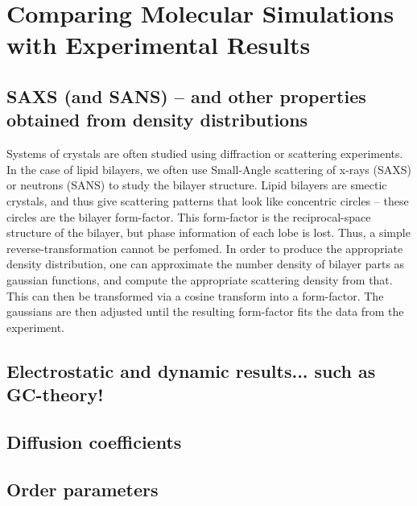 \section{Comparing Molecular Simulations with Experimental Results}
\subsection{SAXS (and SANS) -- and other properties obtained from density distributions}
Systems of crystals are often studied using diffraction or scattering experiments. 
In the case of lipid bilayers, we often use Small-Angle scattering of x-rays (SAXS) or neutrons (SANS) 
to study the bilayer structure. Lipid bilayers are smectic crystals, and thus give scattering
patterns that look like concentric circles -- these circles are the bilayer form-factor. This form-factor
is the reciprocal-space structure of the bilayer, but phase information of each lobe is lost. 
Thus, a simple reverse-transformation cannot be perfomed.
In order to produce the appropriate density distribution, one can approximate the number density of bilayer parts as gaussian functions, and 
compute the appropriate scattering density from that. This can then be transformed via a cosine transform
into a form-factor. The gaussians are then adjusted
until the resulting form-factor fits the data from the experiment.
\subsection{Electrostatic and dynamic results... such as GC-theory!}

\subsection{Diffusion coefficients}

\subsection{Order parameters}

